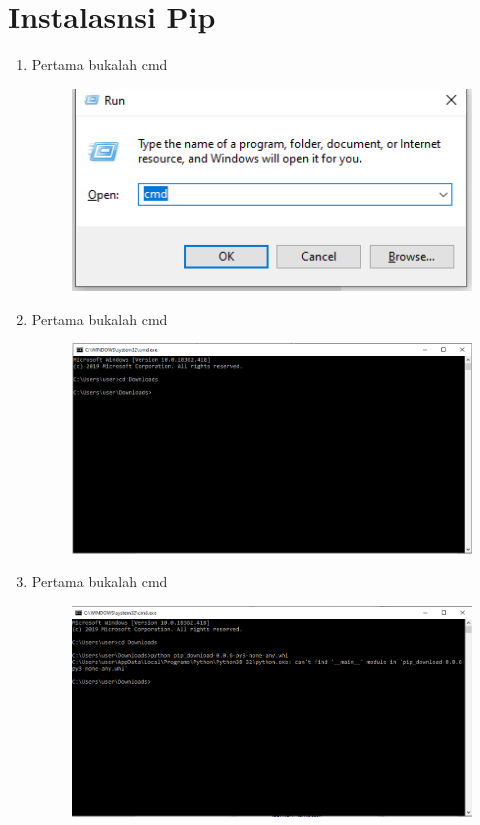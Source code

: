 \section{Instalasnsi Pip}
\begin{enumerate}
    \item Pertama bukalah cmd

\begin{figure}[!htbp]
    \centering
    \includegraphics[scale=0.5]{figures/5.png}
    \label{visimisi}
\end{figure}

    \item Pertama bukalah cmd

\begin{figure}[!htbp]
    \centering
    \includegraphics[scale=0.4]{figures/6.png}
    \label{visimisi}
\end{figure}

    \item Pertama bukalah cmd

\begin{figure}[!htbp]
    \centering
    \includegraphics[scale=0.4]{figures/7.png}
    \label{visimisi}
\end{figure}


\end{enumerate}
